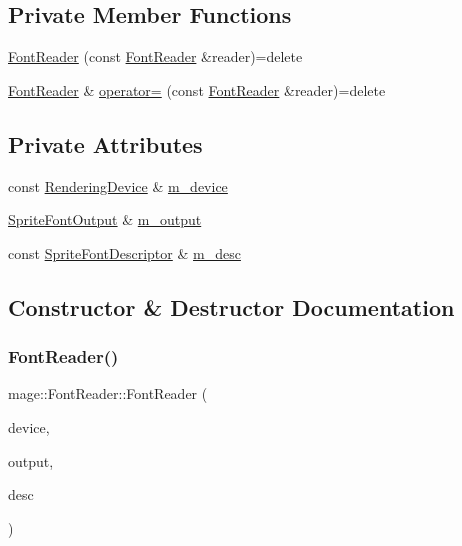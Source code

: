 \subsection*{Private Member Functions}
\begin{DoxyCompactItemize}
\item 
\hyperlink{classmage_1_1_font_reader_ab6009e74fb232f10a96982ef26d6e981}{Font\+Reader} (const \hyperlink{classmage_1_1_font_reader}{Font\+Reader} \&reader)=delete
\item 
\hyperlink{classmage_1_1_font_reader}{Font\+Reader} \& \hyperlink{classmage_1_1_font_reader_a0441ffde1a8246ea1ece461fd22bf691}{operator=} (const \hyperlink{classmage_1_1_font_reader}{Font\+Reader} \&reader)=delete
\end{DoxyCompactItemize}
\subsection*{Private Attributes}
\begin{DoxyCompactItemize}
\item 
const \hyperlink{classmage_1_1_rendering_device}{Rendering\+Device} \& \hyperlink{classmage_1_1_font_reader_a4897c9ac5031ad1860a6ebb15e33f1b8}{m\+\_\+device}
\item 
\hyperlink{structmage_1_1_sprite_font_output}{Sprite\+Font\+Output} \& \hyperlink{classmage_1_1_font_reader_accde629b93d12699ec238239be3f39d2}{m\+\_\+output}
\item 
const \hyperlink{structmage_1_1_sprite_font_descriptor}{Sprite\+Font\+Descriptor} \& \hyperlink{classmage_1_1_font_reader_aa5b91df85bfe35e5ce9b6408bf6d8d5e}{m\+\_\+desc}
\end{DoxyCompactItemize}


\subsection{Constructor \& Destructor Documentation}
\hypertarget{classmage_1_1_font_reader_af12a19e622ed3ca55566f916f44184a6}{}\label{classmage_1_1_font_reader_af12a19e622ed3ca55566f916f44184a6} 
\subsubsection{\texorpdfstring{Font\+Reader()}{FontReader()}\hspace{0.1cm}{\footnotesize\ttfamily [1/2]}}
{\footnotesize\ttfamily mage\+::\+Font\+Reader\+::\+Font\+Reader (\begin{DoxyParamCaption}\item[{const \hyperlink{classmage_1_1_rendering_device}{Rendering\+Device} \&}]{device,  }\item[{\hyperlink{structmage_1_1_sprite_font_output}{Sprite\+Font\+Output} \&}]{output,  }\item[{const \hyperlink{structmage_1_1_sprite_font_descriptor}{Sprite\+Font\+Descriptor} \&}]{desc }\end{DoxyParamCaption})}

